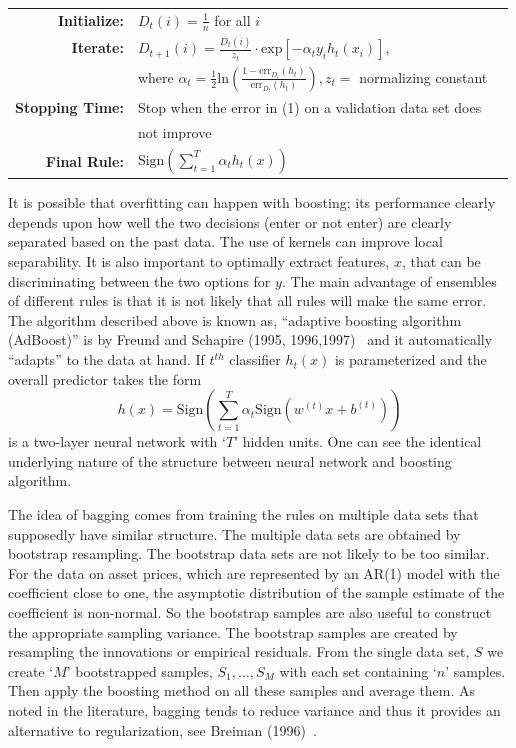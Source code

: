         \begin{table}[!ht]
        \begin{tabular}{r l r}
        \textbf{Initialize:} & $D_t(i)=\frac{1}{n}$ for all $i$  \\
        \textbf{Iterate:} & $D_{t+1}(i)=\frac{D_t(i)}{z_t} \cdot \text{exp}[-\alpha_t y_i h_t(x_i)]$, \\
        & where $\alpha_t=\frac{1}{2}\text{ln} \left( \frac{1-\text{err}_{D_t}(h_t)}{\text{err}_{D_t}(h_t)} \right), z_t=$ normalizing constant \\
        \textbf{Stopping Time:} & Stop when the error in (1) on a validation data set does \\
        & not improve \\
        \textbf{Final Rule:} & $\text{Sign}(\sum_{t=1}^T \alpha_t h_t(x))$  \\
        \end{tabular}
        \end{table}
 
 
 It is possible that overfitting can happen with boosting; its performance clearly depends upon how well the two decisions (enter or not enter) are clearly separated based on the past data. The use of kernels can improve local separability. It is also important to optimally extract features, $x$, that can be discriminating between the two options for $y$. The main advantage of ensembles of different rules is that it is not likely that all rules will make the same error. The algorithm described above is known as, ``adaptive boosting algorithm (AdBoost)'' is by Freund and Schapire (1995, 1996,1997)~\cite{freund1995decision,freund1996experiments,freund1997decision} and it automatically ``adapts'' to the data at hand. If $t^{th}$ classifier $h_t(x)$ is parameterized and the overall predictor takes the form
	\begin{equation}
	h(x)=\text{Sign} \left( \sum_{t=1}^T \alpha_t \text{Sign}(w^{(t)}x+b^{(t)}) \right)
	\end{equation}
is a two-layer neural network with `$T$' hidden units. One can see the identical underlying nature of the structure between neural network and boosting algorithm.


The idea of bagging comes from training the rules on multiple data sets that supposedly have similar structure. The multiple data sets are obtained by bootstrap  resampling. The bootstrap data sets are not likely to be too similar. For the data on asset prices, which are represented by an AR(1) model with the coefficient close to one, the asymptotic distribution of the sample estimate of the coefficient is non-normal. So the bootstrap samples are also useful to construct the appropriate sampling variance. The bootstrap samples are created by resampling the innovations or empirical residuals. From the single data set, $S$ we create `$M$' bootstrapped samples, $S_1, \ldots, S_M$ with each set containing `$n$' samples. Then apply the boosting method on all these samples and average them. As noted in the literature, bagging tends to reduce variance and thus it provides an alternative to regularization, see Breiman (1996)~\cite{breiman1996bagging}.


